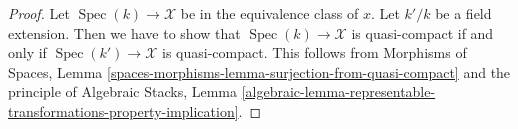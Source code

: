 \documentclass[10pt,a4paper]{amsart}
\theoremstyle{plain}
\theoremstyle{definition}
\theoremstyle{remark}
\numberwithin{equation}{subsection}
\def\Spec{\mathop{\mathrm{Spec}}}
\begin{document}
\begin{proof}
Let $\Spec(k) \to \mathcal{X}$ be in the equivalence
class of $x$. Let $k'/k$ be a field extension.
Then we have to show that $\Spec(k) \to \mathcal{X}$ is
quasi-compact if and only if $\Spec(k') \to \mathcal{X}$
is quasi-compact. This follows from
Morphisms of Spaces, Lemma
\ref{spaces-morphisms-lemma-surjection-from-quasi-compact}
and the principle of Algebraic Stacks, Lemma
\ref{algebraic-lemma-representable-transformations-property-implication}.
\end{proof}
\end{document}
